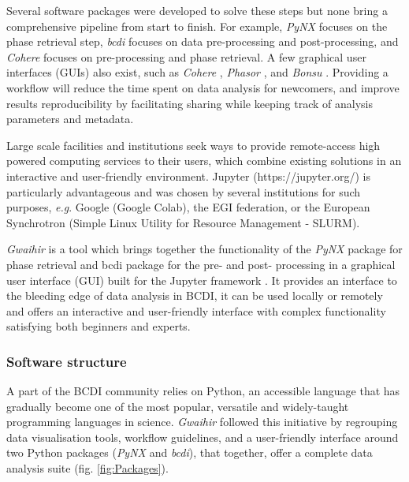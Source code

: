 Several software packages were developed to solve these steps but none bring a comprehensive pipeline from start to finish.
For example, \textit{PyNX} \parencite{pynx2020operators} focuses on the phase retrieval step, \textit{bcdi} \parencite{jerome_carnis_2021_5741935} focuses on data pre-processing and post-processing, and \textit{Cohere} \parencite{cohere_2021} focuses on pre-processing and phase retrieval.
A few graphical user interfaces (GUIs) also exist, such as \textit{Cohere} \parencite{cohere_2021}, \textit{Phasor} \parencite{dzhigaev_dzhigaevdphasor_2021}, and \textit{Bonsu} \parencite{newton_bonsu_2012}.
Providing a workflow will reduce the time spent on data analysis for newcomers, and improve results reproducibility by facilitating sharing while keeping track of analysis parameters and metadata.

Large scale facilities and institutions seek ways to provide remote-access high powered computing services to their users, which combine existing solutions in an interactive and user-friendly environment.
Jupyter (https://jupyter.org/) is particularly advantageous and was chosen by several institutions for such purposes, \textit{e.g}. Google (Google Colab), the EGI federation, or the European Synchrotron (Simple Linux Utility for Resource Management - SLURM).

\textit{Gwaihir} is a tool which brings together the functionality of the \textit{PyNX} package for phase retrieval and bcdi package for the pre- and post- processing in a graphical user interface (GUI) built for the Jupyter framework \parencite{Kluyver2016jupyter}.
It provides an interface to the bleeding edge of data analysis in BCDI, it can be used locally or remotely and offers an interactive and user-friendly interface with complex functionality satisfying both beginners and experts.

\subsubsection{Software structure}

A part of the BCDI community relies on Python, an accessible language that has gradually become one of the most popular, versatile \parencite{IPython, Newville2016} and widely-taught \parencite{Scopatz2015, McKinney2017, Boulle2019} programming languages in science.
\textit{Gwaihir} followed this initiative by regrouping data visualisation tools, workflow guidelines, and a user-friendly interface around two Python packages (\textit{PyNX} and \textit{bcdi}), that together, offer a complete data analysis suite (fig. \ref{fig:Packages}).

